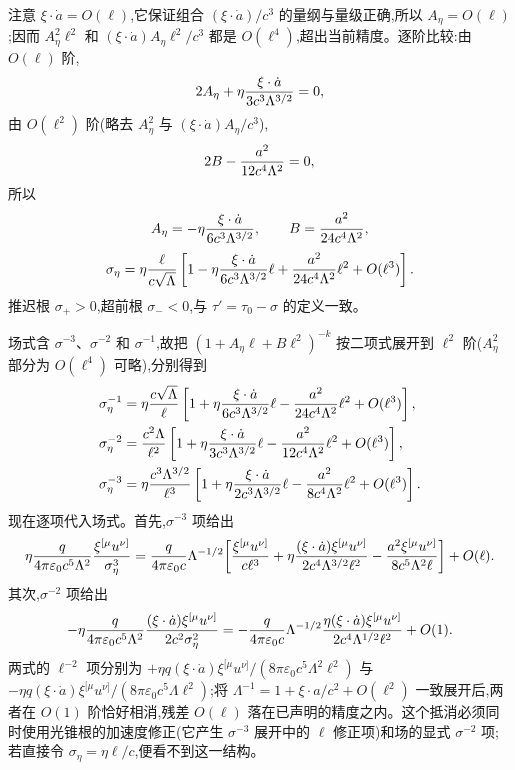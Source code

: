 注意 $\xi\cdot\dot a=O(\ell)$,它保证组合 $(\xi\cdot\dot a)/c^3$ 的量纲与量级正确,所以 $A_\eta=O(\ell)$;因而 $A_\eta^2\ell^2$ 和 $(\xi\cdot\dot a)A_\eta\ell^2/c^3$ 都是 $O(\ell^4)$,超出当前精度。逐阶比较:由 $O(\ell)$ 阶,
\begin{equation*}
 2A_\eta+\eta{\xi\cdot\dot a\over3c^3\Lambda^{3/2}}=0,
\end{equation*}
由 $O(\ell^2)$ 阶(略去 $A_\eta^2$ 与 $(\xi\cdot\dot a)A_\eta/c^3$),
\begin{equation*}
 2B-{a^2\over12c^4\Lambda^2}=0,
\end{equation*}
所以
\begin{equation*}
 A_\eta=-\eta{\xi\cdot\dot a\over6c^3\Lambda^{3/2}},
 \qquad
 B={a^2\over24c^4\Lambda^2},
\end{equation*}
\begin{equation*}
 \sigma_\eta
 =\eta{\ell\over c\sqrt{\Lambda}}
 \left[
 1-\eta{\xi\cdot\dot a\over6c^3\Lambda^{3/2}}\ell
 +{a^2\over24c^4\Lambda^2}\ell^2
 +O(\ell^3)
 \right].
\end{equation*}
推迟根 $\sigma_{+}>0$,超前根 $\sigma_{-}<0$,与 $\tau'=\tau_0-\sigma$ 的定义一致。

场式含 $\sigma^{-3}$、$\sigma^{-2}$ 和 $\sigma^{-1}$,故把 $(1+A_\eta\ell+B\ell^2)^{-k}$ 按二项式展开到 $\ell^2$ 阶($A_\eta^2$ 部分为 $O(\ell^4)$ 可略),分别得到
\begin{align*}
 \sigma_\eta^{-1}
 &=\eta{c\sqrt{\Lambda}\over\ell}
 \left[
 1+\eta{\xi\cdot\dot a\over6c^3\Lambda^{3/2}}\ell
 -{a^2\over24c^4\Lambda^2}\ell^2
 +O(\ell^3)
 \right],\\
 \sigma_\eta^{-2}
 &={c^2\Lambda\over\ell^2}
 \left[
 1+\eta{\xi\cdot\dot a\over3c^3\Lambda^{3/2}}\ell
 -{a^2\over12c^4\Lambda^2}\ell^2
 +O(\ell^3)
 \right],\\
 \sigma_\eta^{-3}
 &=\eta{c^3\Lambda^{3/2}\over\ell^3}
 \left[
 1+\eta{\xi\cdot\dot a\over2c^3\Lambda^{3/2}}\ell
 -{a^2\over8c^4\Lambda^2}\ell^2
 +O(\ell^3)
 \right].
\end{align*}
现在逐项代入场式。首先,$\sigma^{-3}$ 项给出
\begin{align*}
 \eta{q\over4\pi\varepsilon_0c^5\Lambda^2}
 {\xi^{[\mu}u^{\nu]}\over\sigma_\eta^3}
 ={q\over4\pi\varepsilon_0c}
 \Lambda^{-1/2}\bigg[
 {\xi^{[\mu}u^{\nu]}\over c\ell^3}
 +\eta{(\xi\cdot\dot a)\xi^{[\mu}u^{\nu]}\over2c^4\Lambda^{3/2}\ell^2}
 -{a^2\xi^{[\mu}u^{\nu]}\over8c^5\Lambda^2\ell}
 \bigg]+O(\ell).
\end{align*}
其次,$\sigma^{-2}$ 项给出
\begin{equation*}
 -\eta{q\over4\pi\varepsilon_0c^5\Lambda^2}
 {(\xi\cdot\dot a)\xi^{[\mu}u^{\nu]}\over2c^2\sigma_\eta^2}
 =-{q\over4\pi\varepsilon_0c}
 \Lambda^{-1/2}
 {\eta(\xi\cdot\dot a)\xi^{[\mu}u^{\nu]}\over2c^4\Lambda^{1/2}\ell^2}
 +O(1).
\end{equation*}
两式的 $\ell^{-2}$ 项分别为 $+\eta q(\xi\cdot\dot a)\xi^{[\mu}u^{\nu]}/(8\pi\varepsilon_0c^5\Lambda^2\ell^2)$ 与 $-\eta q(\xi\cdot\dot a)\xi^{[\mu}u^{\nu]}/(8\pi\varepsilon_0c^5\Lambda\ell^2)$;将 $\Lambda^{-1}=1+\xi\cdot a/c^2+O(\ell^2)$ 一致展开后,两者在 $O(1)$ 阶恰好相消,残差 $O(\ell)$ 落在已声明的精度之内。这个抵消必须同时使用光锥根的加速度修正(它产生 $\sigma^{-3}$ 展开中的 $\ell$ 修正项)和场的显式 $\sigma^{-2}$ 项;若直接令 $\sigma_\eta=\eta\ell/c$,便看不到这一结构。

